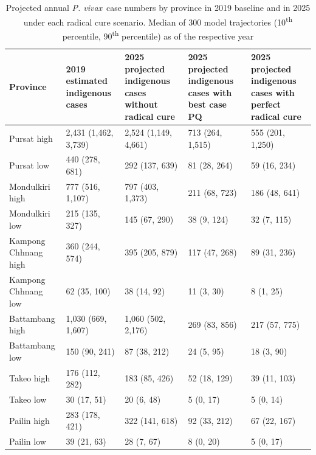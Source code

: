 \documentclass[doublespacing]{bmcart}
\newcommand\nth{\textsuperscript{th}\xspace} %
\newcommand{\pv}{\textit{P. vivax}}
\newcommand{\pq}{PQ}
\begin{document}
\begin{table}
\scriptsize
\begin{center}
\begin{tabular}{p{}p{}p{}p{}p{}}
\hline
Province  & 2019 estimated indigenous cases&2025 projected indigenous cases without radical cure&2025 projected indigenous cases with best case \pq&2025 projected indigenous cases with perfect radical cure \\
\hline
Pursat high & 2,431 (1,462, 3,739)&2,524 (1,149, 4,661)&713 (264, 1,515)&555 (201, 1,250) \\
Pursat low & 440 (278, 681)&292 (137, 639)&81 (28, 264)&59 (16, 234) \\
Mondulkiri high & 777 (516, 1,107)&797 (403, 1,373)&211 (68, 723)&186 (48, 641) \\
Mondulkiri low & 215 (135, 327)&145 (67, 290)&38 (9, 124)&32 (7, 115) \\
Kampong Chhnang high & 360 (244, 574)&395 (205, 879)&117 (47, 268)&89 (31, 236) \\
Kampong Chhnang low & 62 (35, 100)&38 (14, 92)&11 (3, 30)&8 (1, 25) \\
Battambang high & 1,030 (669, 1,607)&1,060 (502, 2,176)&269 (83, 856)&217 (57, 775) \\
Battambang low & 150 (90, 241)&87 (38, 212)&24 (5, 95)&18 (3, 90) \\
Takeo high & 176 (112, 282)&183 (85, 426)&52 (18, 129)&39 (11, 103) \\
Takeo low & 30 (17, 51)&20 (6, 48)&5 (0, 17)&5 (0, 14) \\
Pailin high & 283 (178, 421)&322 (141, 618)&92 (33, 212)&67 (22, 167) \\
Pailin low & 39 (21, 63)&28 (7, 67)&8 (0, 20)&5 (0, 17) \\
\hline
\end{tabular}
\caption{Projected annual \pv~case numbers by province in 2019 baseline and in 2025 under each radical cure scenario. Median of 300 model trajectories (10\nth percentile, 90\nth percentile) as of the respective year}\label{tab:radcure_numbers}
\end{center}
\end{table}
\end{document}

